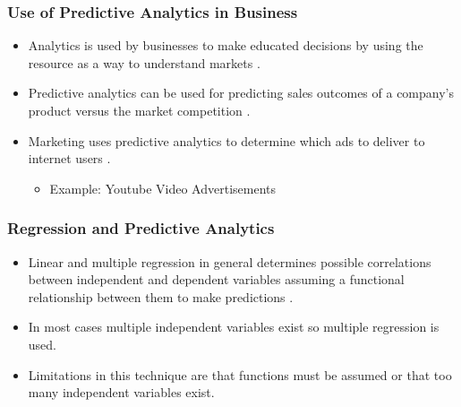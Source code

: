\documentclass{beamer}
\begin{document}
\begin{frame}
\frametitle{Use of Predictive Analytics in Business}
\begin{itemize}
    \item Analytics is used by businesses to make educated decisions by using the resource as a way to understand markets \cite{Jeble2016}.
    \item Predictive analytics can be used for predicting sales outcomes of a company's product versus the market competition \cite{Jeble2016}.
    \item Marketing uses predictive analytics to determine which ads to deliver to internet users \cite{Jeble2016}.
        \begin{itemize}
        \item Example: Youtube Video Advertisements 
        \end{itemize}
\end{itemize}

\end{frame}

\begin{frame}
\frametitle{Regression and Predictive Analytics}
\begin{itemize}
    \item Linear and multiple regression in general determines possible correlations between independent and dependent variables assuming a functional relationship between them to make predictions \cite{Stats2015}. 
    \item In most cases multiple independent variables exist so multiple regression is used.
    \item Limitations in this technique are that functions must be assumed or that too many independent variables exist.
\end{itemize}
\end{frame}
\end{document}
